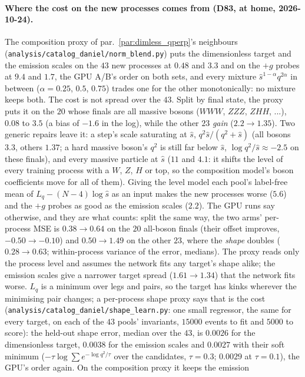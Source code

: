 \documentclass[11pt]{article}
\newcommand{\code}[1]{\texttt{#1}}
\begin{document}
\paragraph{Where the cost on the new processes comes from (D83, at home, 2026-10-24).}\label{par:qperp_cost} The
composition proxy of par.\ \ref{par:dimless_qperp}'s neighbours (\code{analysis/catalog\_daniel/norm\_blend.py}) puts the
dimensionless target and the emission scales on the $43$ new processes at $0.48$ and $3.3$ and on the $+g$ probes at $9.4$
and $1.7$, the GPU A/B's order on both sets, and every mixture $\hat s^{1-\alpha} q^{2\alpha}$ in between ($\alpha=0.25$, $0.5$,
$0.75$) trades one for the other monotonically: no mixture keeps both. The cost is not spread over the $43$. Split by final
state, the proxy puts it on the $20$ whose finals are all massive bosons ($WWW$, $ZZZ$, $ZHH$, ...), $0.08$ to $3.5$ (a
bias of $-1.6$ in the log), while the other $23$ \emph{gain} ($2.2\to1.35$). Two generic repairs leave it: a step's scale saturating at
$\hat s$, $q^2\hat s/(q^2+\hat s)$ (all bosons $3.3$, others $1.37$; a hard massive boson's $q^2$ is still far below
$\hat s$, $\log q^2/\hat s\approx-2.5$ on these finals), and every massive particle at $\hat s$ ($11$ and $4.1$: it shifts the
level of every training process with a $W$, $Z$, $H$ or top, so the composition model's boson coefficients move for
all of them). Giving the level model each pool's label-free mean of $L_q-(N-4)\log\hat s$ as an input makes the new
processes worse ($5.6$) and the $+g$ probes as good as the emission scales ($2.2$). The GPU runs say otherwise, and they are what counts: split the
same way, the two arms' per-process MSE is $0.38\to0.64$ on the $20$ all-boson finals (their offset improves, $-0.50\to-0.10$)
and $0.50\to1.49$ on the other $23$, where the \emph{shape} doubles ($0.28\to0.63$; within-process variance of the error,
medians). The proxy reads only the process level and assumes the network fits any target's shape alike; the emission
scales give a narrower target spread ($1.61\to1.34$) that the network fits worse. $L_q$ is a minimum over legs and pairs, so
the target has kinks wherever the minimising pair changes; a per-process shape proxy says that is the cost
(\code{analysis/catalog\_daniel/shape\_learn.py}: one small regressor, the same for every target, on each of the $43$
pools' invariants, $15000$ events to fit and $5000$ to score): the held-out shape error, median over the $43$, is
$0.0026$ for the dimensionless target, $0.0038$ for the emission scales and $0.0027$ with their soft minimum
($-\tau\log\sum e^{-\log q^2/\tau}$ over the candidates, $\tau=0.3$; $0.0029$ at $\tau=0.1$), the GPU's order again. On the composition proxy it keeps the emission
\end{document}
